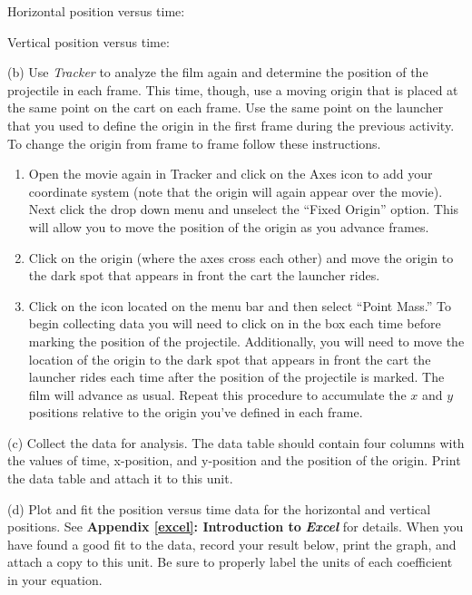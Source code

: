 Horizontal position versus time:
\vspace{10mm}

Vertical position versus time:
\vspace{10mm}

(b) Use \emph{Tracker} to analyze the film  again and determine the position of the projectile in each
frame. This time, though, use a moving origin that is placed
at the same point on the cart on each frame. Use the same point on
the launcher that you used to define the origin in the first frame
during the previous activity. To change the origin from frame to frame
follow these instructions.

\begin{enumerate}
\item Open the movie again in Tracker and click on the Axes icon to add your coordinate system (note that the origin will again appear over the movie).  Next click the  drop down menu and unselect the ``Fixed Origin'' option. This will allow you to move the position of the origin as you advance frames.

\item Click on the origin (where the axes cross each other) and move the origin to the dark spot that appears in front the cart the launcher rides.

\item Click on the  icon located on the menu bar and then select ``Point Mass.''  To begin collecting data you will need to click on  in the  box each time before marking the position of the projectile.  Additionally, you will need to move the location of the origin to the dark spot that appears in front the cart the launcher rides each time after the position of the projectile is marked.  The film will advance as usual. Repeat this procedure to accumulate
the $x$ and $y$ positions relative to the origin you've defined in each
frame.
\end{enumerate}
(c) Collect the data for analysis. The data table should contain four
columns with the values of time, x-position, and y-position and the
position of the origin. Print the data table and attach it to this unit.

\pagebreak[2]
(d) Plot and fit the position versus time data for the horizontal
and vertical positions. See \textbf{Appendix \ref{excel}: Introduction to} \textbf{\emph{Excel}}
for details. When you have found a good fit to the data, record your
result below, print the graph, and attach a copy to this unit. Be
sure to properly label the units of each coefficient in your equation.

